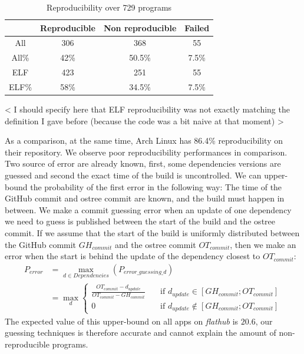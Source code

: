 \documentclass[a4paper,11pt,oneside]{report}
\newcommand{\fh}{\emph{flathub}\xspace}
\begin{document}
\begin{table}[h]
    \centering
        \begin{tabular}{|c|c|c|c|}
            \hline
            & Reproducible & Non reproducible & Failed\\
            \hline
            All & 306 & 368 & 55\\
            \hline
            All\% & 42\% & 50.5\% & 7.5\% \\
            \hline
            ELF & 423 & 251 & 55\\
            \hline
            ELF\% & 58\% & 34.5\% & 7.5\% \\
            \hline
        \end{tabular}
    \caption{Reproducibility over 729 programs}
    \label{tab:rebuild-all}
\end{table}

< I should specify here that ELF reproducibility was not exactly matching the definition I gave before (because the code was a bit naive at that moment) >

As a comparison, at the same time, Arch Linux has 86.4\% reproducibility on
their repository\cite{arch-rebuilderd}. We observe poor reproducibility
performances in comparison. Two source of error are already known, first, some
dependencies versions are guessed and second the exact time of the build is
uncontrolled. We can upper-bound the probability of the first error in the
following way: The time of the GitHub commit and ostree commit are known, and
the build must happen in between. We make a commit guessing error when an
update of one dependency we need to guess is published between the start of the
build and the ostree commit. If we assume that the start of the build is
uniformly distributed between the GitHub commit $GH_{commit}$ and the ostree
commit $OT_{commit}$, then we make an error when the start is behind the update
of the dependency closest to $OT_{commit}$:
\begin{align}
    P_{error} &= \max_{d \in Dependencies}(P_{error\_guessing\_d}) \\
              &= \max_{d}
              \begin{cases}
                \frac{OT_{commit} - d_{update}}{OT_{commit} -
                    GH_{commit}}  & \quad \text{if } d_{update}
                    \in [GH_{commit}; OT_{commit}] \\
                0  & \quad \text{if } d_{update}
                  \notin [GH_{commit}; OT_{commit}]
              \end{cases}
\end{align}
The expected value of this upper-bound on all apps on \fh is $20.6$, our
guessing techniques is therefore accurate and cannot explain the amount of
non-reproducible programs.
\end{document}
